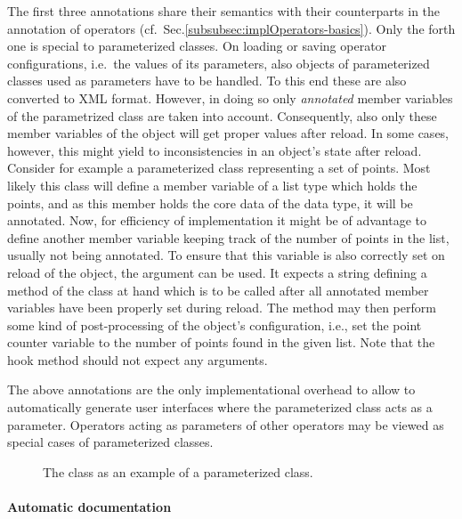 The first three annotations share their semantics with their counterparts in the
 annotation of operators
(cf.~Sec.\ref{subsubsec:implOperators-basics}).
Only the forth one is special to parameterized classes. On loading or saving
operator configurations, i.e.~the values of its parameters, also objects of
parameterized classes used as parameters have to be handled. To this end these
are also converted to XML format. However, in doing so only {\em annotated}
member variables of the parametrized class are taken into account. Consequently,
also only these member variables of the object will get proper values after
reload.
In some cases, however, this might yield to inconsistencies in an object's state
after reload. Consider for example a parameterized class representing a set of
points. Most likely this class will define a member variable of a list type
which holds the points, and as this member holds the core data of the data
type, it will be annotated.
Now, for efficiency of implementation it might be of advantage to define another
member variable keeping track of the number of points in the list, usually not
being annotated. To ensure that this variable is also correctly set on reload of
the object, the  argument can be used. It expects a
string defining a method of the class at hand which is to be called after all
annotated member variables have been properly set during reload. The method may
then perform some kind of post-processing of the object's configuration, i.e.,
set the point counter variable to the number of points found in the given list.
Note that the hook method should not expect any arguments.

The above annotations are
the only implementational overhead to allow \alida to automatically generate user interfaces where the parameterized class acts as a parameter.
Operators acting as parameters of other operators may be viewed as
special cases of parameterized classes.


\begin{figure}
%
\caption{\label{exa:parametrizedClass}The class  as an example of a parameterized class.}
\end{figure}

\paragraph{Automatic documentation}

